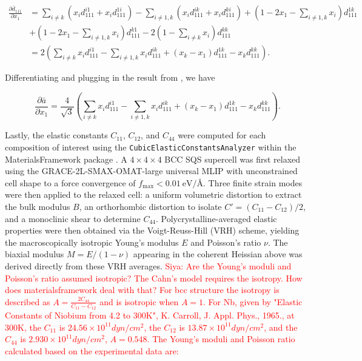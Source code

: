 \begin{small}
\begin{equation}\label{bond_length_der_dep}
\begin{split}
\frac{\partial \bar{d}_{111}}{\partial x_1}&=\sum_{i\neq k}(x_id^{i1}_{111}+x_id^{1i}_{111})-\sum_{i\neq 1,k}(x_id^{ik}_{111}+x_id^{ki}_{111})+(1-2x_1-\sum_{i\neq 1,k}x_i)d^{1k}_{111}\\ & + (1-2x_1-\sum_{i\neq 1,k}x_i)d^{k1}_{111} - 2(1-\sum_{i\neq k} x_i)d^{kk}_{111}\\&
=2\left(\sum_{i\neq k}x_id^{i1}_{111} - \sum_{i\neq 1,k} x_id^{ik}_{111} + (x_k-x_1)d^{1k}_{111}-x_kd^{kk}_{111}\right).
\end{split}
\end{equation}
\end{small}

\noindent Differentiating  and plugging in the result from , we have

\begin{equation}
\frac{\partial \bar{a}}{\partial x_1}=\frac{4}{\sqrt{3}}\left(\sum_{i\neq k}x_id^{i1}_{111} - \sum_{i\neq 1,k} x_id^{ik}_{111} + (x_k-x_1)d^{1k}_{111}-x_kd^{kk}_{111}\right).
\end{equation}

Lastly, the elastic constants $C_{11}$, $C_{12}$, and $C_{44}$ were computed for each composition of interest using the \texttt{CubicElasticConstantsAnalyzer} within the MaterialsFramework package \cite{sariturk_2025_15731044}. A $4\times4\times4$ BCC SQS supercell was first relaxed using the GRACE-2L-SMAX-OMAT-large universal MLIP with unconstrained cell shape to a force convergence of $f_{\mathrm{max}} < \SI{0.01}{\electronvolt/\angstrom}$. Three finite strain modes were then applied to the relaxed cell: a uniform volumetric distortion to extract the bulk modulus $B$, an orthorhombic distortion to isolate $C'=\left(C_{11}-C_{12}\right)/2$, and a monoclinic shear to determine $C_{44}$. Polycrystalline-averaged elastic properties were then obtained via the Voigt-Reuss-Hill (VRH) scheme, yielding the macroscopically isotropic Young's modulus $E$ and Poisson's ratio $\nu$. The biaxial modulus $M = E/\left(1-\nu\right)$ appearing in the coherent Heissian above was derived directly from these VRH averages. \textcolor{red}{Siya: Are the Young's moduli and Poisson's ratio assumed isotropic? The Cahn's model requires the isotropy. How does materialsframework deal with that? For bcc structure the isotropy is described as $A=\frac{2C_{44}}{C_{11}-C_{12}}$ and is isotropic when $A=1$. For Nb, given by "Elastic Constants of Niobium from 4.2 to 300K", K. Carroll, J. Appl. Phys., 1965., at 300K, the $C_{11}$ is $24.56\times 10^{11} dyn/cm^2$, the $C_{12}$ is $13.87\times 10^{11} dyn/cm^2$, and the $C_{44}$ is $2.930\times 10^{11} dyn/cm^2$, $A = 0.548$. The Young's moduli and Poisson ratio calculated based on the experimental data are:
} 

